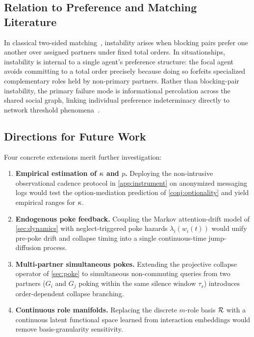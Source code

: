 \subsection{Relation to Preference and Matching Literature}
\label{subsec:disc-literature}

In classical two-sided matching~\citep{gale1962college,roth1990two}, instability
arises when blocking pairs prefer one another over assigned partners under
fixed total orders. In situationships, instability is internal to a single
agent's preference structure: the focal agent avoids committing to a total order
precisely because doing so forfeits specialized complementary roles held by
non-primary partners. Rather than blocking-pair instability, the primary
failure mode is informational percolation across the shared social graph,
linking individual preference indeterminacy directly to network threshold
phenomena~\citep{granovetter1978threshold,watts2002simple}.

\subsection{Directions for Future Work}
\label{subsec:disc-future}

Four concrete extensions merit further investigation:
\begin{enumerate}[nosep]
  \item \textbf{Empirical estimation of $\kappa$ and $p$.} Deploying the
        non-intrusive observational cadence protocol in \cref{app:instrument}
        on anonymized messaging logs would test the option-mediation prediction
        of \cref{conj:optionality} and yield empirical ranges for $\kappa$.
  \item \textbf{Endogenous poke feedback.} Coupling the Markov attention-drift
        model of \cref{sec:dynamics} with neglect-triggered poke hazards
        $\lambda_i(w_i(t))$ would unify pre-poke drift and collapse timing into
        a single continuous-time jump-diffusion process.
  \item \textbf{Multi-partner simultaneous pokes.} Extending the projective
        collapse operator of \cref{sec:poke} to simultaneous non-commuting
        queries from two partners ($G_i$ and $G_j$ poking within the same
        silence window $\tau_s$) introduces order-dependent collapse branching.
  \item \textbf{Continuous role manifolds.} Replacing the discrete $m$-role
        basis $\mathcal{R}$ with a continuous latent functional space learned from
        interaction embeddings would remove basis-granularity sensitivity.
\end{enumerate}

